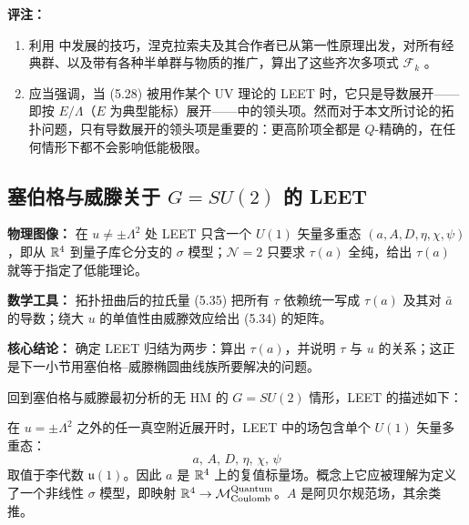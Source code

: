 \medskip
\noindent\textbf{评注：}
\begin{enumerate}[label=\arabic*., leftmargin=2.1em]
\item 利用 \cite{ref39,ref40} 中发展的技巧，涅克拉索夫及其合作者已从第一性原理出发，对所有经典群、以及带有各种半单群与物质的推广，算出了这些齐次多项式 $\mathcal{F}_{k}$ \cite{ref43,ref44,ref45}。
\item 应当强调，当 (5.28) 被用作某个 UV 理论的 LEET 时，它只是导数展开——即按 $E/\Lambda$（$E$ 为典型能标）展开——中的领头项。然而对于本文所讨论的拓扑问题，只有导数展开的领头项是重要的：更高阶项全都是 $Q$-精确的，在任何情形下都不会影响低能极限。
\end{enumerate}

\subsection{塞伯格与威滕关于 $G=SU(2)$ 的 LEET}

\begin{keytakeaways}
\item \textbf{物理图像：} 在 $u\neq\pm\Lambda^{2}$ 处 LEET 只含一个 $U(1)$ 矢量多重态 $(a,A,D,\eta,\chi,\psi)$，即从 $\mathbb{R}^{4}$ 到量子库仑分支的 $\sigma$ 模型；$\mathcal{N}=2$ 只要求 $\tau(a)$ 全纯，给出 $\tau(a)$ 就等于指定了低能理论。
\item \textbf{数学工具：} 拓扑扭曲后的拉氏量 (5.35) 把所有 $\tau$ 依赖统一写成 $\tau(a)$ 及其对 $\bar a$ 的导数；绕大 $u$ 的单值性由威滕效应给出 (5.34) 的矩阵。
\item \textbf{核心结论：} 确定 LEET 归结为两步：算出 $\tau(a)$，并说明 $\tau$ 与 $u$ 的关系；这正是下一小节用塞伯格--威滕椭圆曲线族所要解决的问题。
\end{keytakeaways}

回到塞伯格与威滕最初分析的无 HM 的 $G=SU(2)$ 情形，LEET 的描述如下：

在 $u=\pm\Lambda^{2}$ 之外的任一真空附近展开时，LEET 中的场包含单个 $U(1)$ 矢量多重态：
\begin{equation}
a,\,A,\,D,\,\eta,\,\chi,\,\psi
\tag{5.33}
\end{equation}
取值于李代数 $\mathfrak{u}(1)$。因此 $a$ 是 $\mathbb{R}^{4}$ 上的复值标量场。概念上它应被理解为定义了一个非线性 $\sigma$ 模型，即映射 $\mathbb{R}^{4}\to\mathcal{M}^{\text{Quantum}}_{\text{Coulomb}}$。$A$ 是阿贝尔规范场，其余类推。

